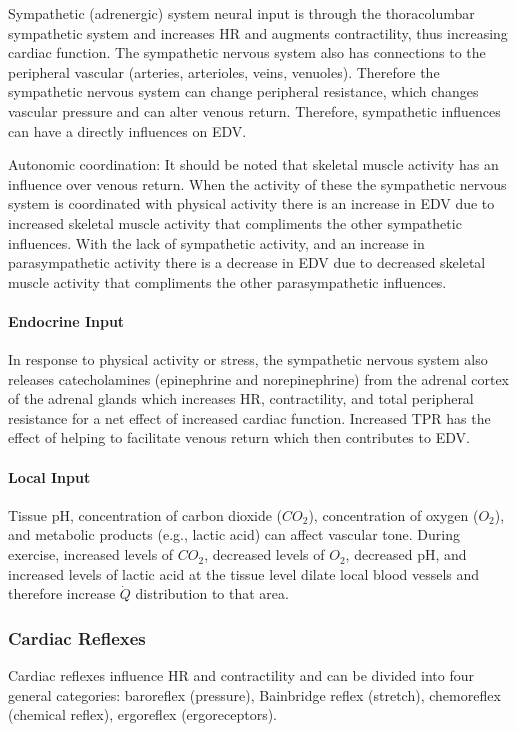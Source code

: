 Sympathetic (adrenergic) system neural input is through the thoracolumbar sympathetic system and increases HR and augments contractility, thus increasing cardiac function. The sympathetic nervous system also has connections to the peripheral vascular (arteries, arterioles, veins, venuoles). Therefore the sympathetic nervous system can change peripheral resistance, which changes vascular pressure and can alter venous return. Therefore, sympathetic influences can have a directly influences on EDV. 

Autonomic coordination: It should be noted that skeletal muscle activity has an influence over venous return. When the activity of these the sympathetic nervous system is coordinated with physical activity there is an increase in EDV due to increased skeletal muscle activity that compliments the other sympathetic influences. With the lack of sympathetic activity, and an increase in parasympathetic activity there is a decrease in EDV due to decreased skeletal muscle activity that compliments the other parasympathetic influences. 

\paragraph{Endocrine Input}
In response to physical activity or stress, the sympathetic nervous system also releases catecholamines (epinephrine and norepinephrine) from the adrenal cortex of the adrenal glands which increases HR, contractility, and total peripheral resistance for a net effect of increased cardiac function. Increased TPR has the effect of helping to facilitate venous return which then contributes to EDV.

\paragraph{Local Input}
Tissue pH, concentration of carbon dioxide ($CO_2$), concentration of oxygen ($O_2$), and metabolic products (e.g., lactic acid) can affect vascular tone. During exercise, increased levels of $CO_2$, decreased levels of $O_2$, decreased pH, and increased levels of lactic acid at the tissue level dilate local blood vessels and therefore increase $\dot{Q}$ distribution to that area.

\subsubsection{Cardiac Reflexes} %
Cardiac reflexes influence HR and contractility and can be divided into four general categories: baroreflex (pressure), Bainbridge reflex (stretch), chemoreflex (chemical reflex), ergoreflex (ergoreceptors). 

